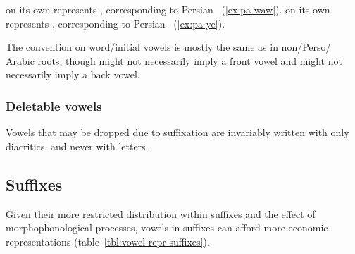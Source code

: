  on its own represents , corresponding to
Persian ~(\vref{ex:pa-waw}).
 on its own represents , corresponding to
Persian ~(\vref{ex:pa-ye}).

\pex
  \a\label{ex:pa-waw}%
  \a\label{ex:pa-ye}%
\xe

The convention on word\-/initial vowels is mostly the same as in non\-/Perso\-/%
Arabic roots, though  might not necessarily imply a
front vowel and  might not necessarily imply a back
vowel.

\ex
\xe

\subsubsection{Deletable vowels}

Vowels that may be dropped due to suffixation are invariably written with only
diacritics, and never with  letters.

\ex
\xe

\subsection{Suffixes}

Given their more restricted distribution within suffixes and the effect of
morphophonological processes, vowels in suffixes can afford more economic
representations (table~\vref{tbl:vowel-repr-suffixes}).

